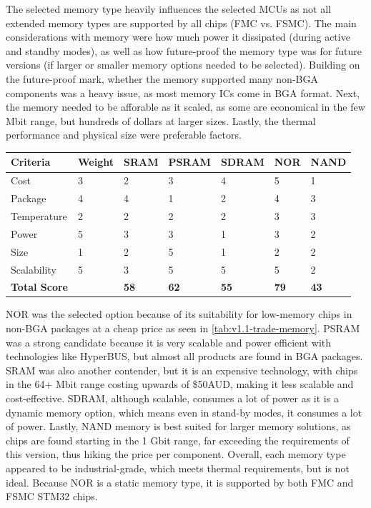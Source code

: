 The selected memory type heavily influences the selected MCUs as not all extended memory types are supported by all chips (FMC vs. FSMC). The main considerations with memory were how much power it dissipated (during active and standby modes), as well as how future-proof the memory type was for future versions (if larger or smaller memory options needed to be selected). Building on the future-proof mark, whether the memory supported many non-BGA components was a heavy issue, as most memory ICs come in BGA format. Next, the memory needed to be afforable as it scaled, as some are economical in the few Mbit range, but hundreds of dollars at larger sizes. Lastly, the thermal performance and physical size were preferable factors.

\begin{indentedtable}
    \centering
    \begin{tabular}{|l|l|l|l|l|l|l|}
        \hline
        \textbf{Criteria} & \textbf{Weight} & \textbf{SRAM} & \textbf{PSRAM} & \textbf{SDRAM} & \textbf{NOR} & \textbf{NAND} \\
        \hline
        Cost & 3 & 2 & 3 & 4 & 5 & 1 \\
        \hline
        Package & 4 & 4 & 1 & 2 & 4 & 3 \\
        \hline
        Temperature & 2 & 2 & 2 & 2 & 3 & 3 \\
        \hline
        Power & 5 & 3 & 3 & 1 & 3 & 2 \\
        \hline
        Size & 1 & 2 & 5 & 1 & 2 & 2 \\
        \hline
        Scalability & 5 & 3 & 5 & 5 & 5 & 2 \\
        \hline
        \hline
        \textbf{Total Score} &   & \textbf{58} & \textbf{62} & \textbf{55} & \textbf{79} & \textbf{43} \\
        \hline
    \end{tabular}
    \caption{C2Sv1.1 trade study comparing different extended memory options for the STM32 on a scale (1-5).}
    \label{tab:v1.1-trade-memory}
\end{indentedtable}

NOR was the selected option because of its suitability for low-memory chips in non-BGA packages at a cheap price as seen in \autoref{tab:v1.1-trade-memory}. PSRAM was a strong candidate because it is very scalable and power efficient with technologies like HyperBUS, but almost all products are found in BGA packages.
SRAM was also another contender, but it is an expensive technology, with chips in the 64+ Mbit range costing upwards of \$50AUD, making it less scalable and cost-effective.
SDRAM, although scalable, consumes a lot of power as it is a dynamic memory option, which means even in stand-by modes, it consumes a lot of power.
Lastly, NAND memory is best suited for larger memory solutions, as chips are found starting in the 1 Gbit range, far exceeding the requirements of this version, thus hiking the price per component.
Overall, each memory type appeared to be industrial-grade, which meets thermal requirements, but is not ideal.
\nl
Because NOR is a static memory type, it is supported by both FMC and FSMC STM32 chips.